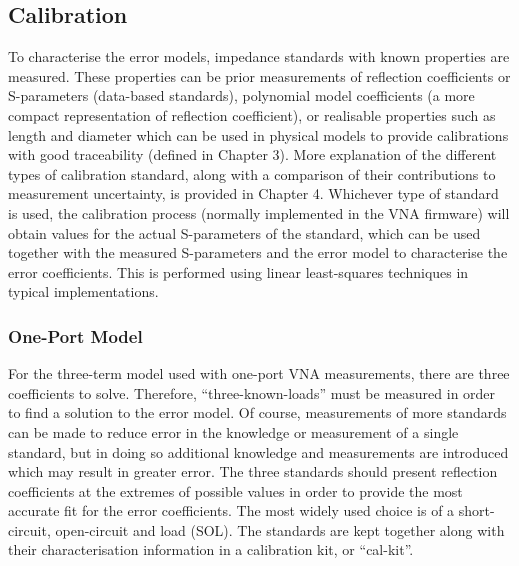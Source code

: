 \documentclass[../thesis/thesis.tex]{subfiles}
\begin{document}
\subsection{Calibration}

To characterise the error models, impedance standards with known properties are measured. These properties can be prior measurements of reflection coefficients or S-parameters (data-based standards), polynomial model coefficients (a more compact representation of reflection coefficient), or realisable properties such as length and diameter which can be used in physical models to provide calibrations with good traceability (defined in Chapter 3). More explanation of the different types of calibration standard, along with a comparison of their contributions to measurement uncertainty, is provided in Chapter 4. Whichever type of standard is used, the calibration process (normally implemented in the VNA firmware) will obtain values for the actual S-parameters of the standard, which can be used together with the measured S-parameters and the error model to characterise the error coefficients. This is performed using linear least-squares techniques in typical implementations.

\subsubsection{One-Port Model}

For the three-term model used with one-port VNA measurements, there are three coefficients to solve. Therefore, ``three-known-loads'' must be measured in order to find a solution to the error model. Of course, measurements of more standards can be made to reduce error in the knowledge or measurement of a single standard, but in doing so additional knowledge and measurements are introduced which may result in greater error. The three standards should present reflection coefficients at the extremes of possible values in order to provide the most accurate fit for the error coefficients. The most widely used choice is of a short-circuit, open-circuit and load (SOL). The standards are kept together along with their characterisation information in a calibration kit, or ``cal-kit''.
\end{document}

